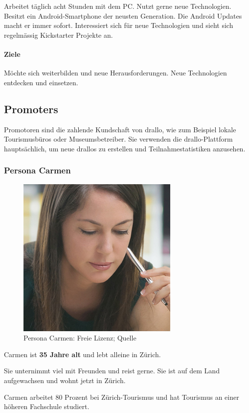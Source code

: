 Arbeitet täglich acht Stunden mit dem PC. Nutzt gerne neue Technologien. Besitzt ein Android-Smartphone der neusten Generation. Die Android Updates macht er immer sofort. Interessiert sich für neue Technologien und sieht sich regelmässig Kickstarter Projekte an.\\ 

\paragraph{Ziele} 

Möchte sich weiterbilden und neue Herausforderungen. Neue Technologien entdecken und einsetzen.\\

\subsection{Promoters}

Promotoren sind die zahlende Kundschaft von drallo, wie zum Beispiel lokale Tourismusbüros oder Museumsbetreiber. Sie verwenden die drallo-Plattform hauptsächlich, um neue drallos zu erstellen und Teilnahmestatistiken anzusehen.

\subsubsection{Persona Carmen}
\begin{figure}
	\includegraphics[width=.35\textwidth]{images/persona-carmen.jpg} 
	\caption{Persona Carmen: Freie Lizenz; Quelle} %
	\label{fig:carmen}
\end{figure}


Carmen ist \textbf{35 Jahre alt} und lebt alleine in Zürich.

Sie unternimmt viel mit Freunden und reist gerne. Sie ist auf dem Land aufgewachsen und wohnt jetzt in Zürich. 

Carmen arbeitet 80 Prozent bei Zürich-Tourismus und hat Tourismus an einer höheren Fachschule studiert.

